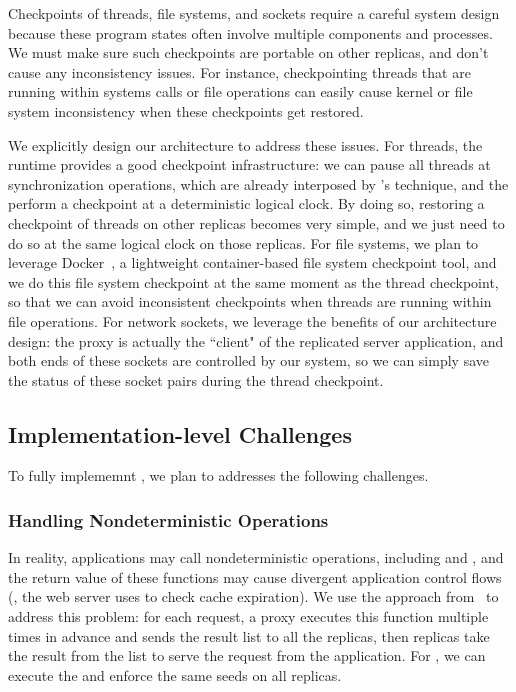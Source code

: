 Checkpoints of threads, file systems, and sockets require a careful \crane
system design because these program states often involve multiple \crane
components and processes. We must make sure such checkpoints are portable on
other replicas, and don't cause any inconsistency issues. For instance,
checkpointing threads that are running within systems calls or file operations
can easily cause kernel or file system inconsistency when these checkpoints get
restored.

We explicitly design our \crane architecture to address these issues. For
threads, the \parrot \smt runtime provides a good checkpoint infrastructure: we
can pause all threads at synchronization operations, which are already
interposed by \parrot's \ldpreload technique, and the perform a checkpoint at a
deterministic logical clock. By doing so, restoring a checkpoint of threads on
other replicas becomes very simple, and we just need to do so at the same
logical clock on those replicas. For file systems, we plan to leverage
Docker~\cite{docker}, a lightweight container-based file system checkpoint tool,
and we do this file system checkpoint at the same moment as the thread
checkpoint, so that we can avoid inconsistent checkpoints when threads are
running within file operations. For network sockets, we leverage the benefits of
our architecture design: the proxy is actually the ``client" of the replicated
server application, and both ends of these sockets are controlled by our system,
so we can simply save the 
status of these socket pairs during the thread checkpoint.










\subsection{Implementation-level Challenges} \label{sec:rep-impl}
To fully implememnt \crane, we plan to addresses the following challenges.

\subsubsection{Handling Nondeterministic Operations} \label{sec:rep-nondet}
In reality, applications may call nondeterministic operations, including
\randfunc and \gettimeofday, and the return value of these functions may cause
divergent application control flows (\eg, the \apache web server uses
\gettimeofday to check cache expiration). We use the approach
from~\cite{paxos:practical} to address this problem: for each request, a \crane
proxy executes this function multiple times in advance and sends the result list
to all the replicas, then replicas take the result from the list to serve the
request from the application. For \randfunc, we can execute the \srandfunc and
enforce the same seeds on all replicas.

